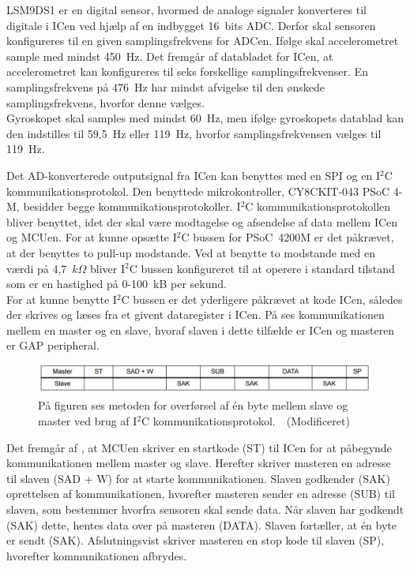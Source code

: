 LSM9DS1 er en digital sensor, hvormed de analoge signaler konverteres til digitale i ICen ved hjælp af en indbygget 16~bits ADC. Derfor skal sensoren konfigureres til en given samplingsfrekvens for ADCen. Ifølge  skal accelerometret sample med mindst 450~Hz. Det fremgår af databladet for ICen, at accelerometret kan konfigureres til seks forskellige samplingsfrekvenser. En samplingsfrekvens på 476~Hz har mindst afvigelse til den ønskede samplingsfrekvens, hvorfor denne vælges. \\
Gyroskopet skal samples med mindst 60~Hz, men ifølge gyroskopets datablad kan den indstilles til 59,5~Hz eller 119~Hz, hvorfor samplingsfrekvensen vælges til 119~Hz.

Det AD-konverterede outputsignal fra ICen kan benyttes med en SPI og en I$^{2}$C kommunikationsprotokol. Den benyttede mikrokontroller, CY8CKIT-043 PSoC 4-M, besidder begge kommunikationsprotokoller. I$^{2}$C kommunikationsprotokollen bliver benyttet, idet der skal være modtagelse og afsendelse af data mellem ICen og MCUen. For at kunne opsætte I$^{2}$C bussen for PSoC~4200M er det påkrævet, at der benyttes to pull-up modstande. Ved at benytte to modstande med en værdi på 4,7~$k\Omega$ bliver I$^{2}$C bussen konfigureret til at operere i standard tilstand som er en hastighed på 0-100~kB per sekund.~\citep{CYPRESS2016} \\
For at kunne benytte I$^{2}$C bussen er det yderligere påkrævet at kode ICen, således der skrives og læses fra et givent dataregister i ICen. På  ses kommunikationen mellem en master og en slave, hvoraf slaven i dette tilfælde er ICen og masteren er GAP peripheral. 
\begin{figure}[H]
	\centering
	\includegraphics[scale=0.75]{figures/cDesign/Sensor_write_read2.png}
	\caption{På figuren ses metoden for overførsel af én byte mellem slave og master ved brug af I$^{2}$C kommunikationsprotokol.~\citep{STMicroelectronics2016}~(Modificeret)}
	\label{Fig:master_slave}
\end{figure}\vspace{-0.25cm}
Det fremgår af , at MCUen skriver en startkode (ST) til ICen for at påbegynde kommunikationen mellem master og slave. Herefter skriver masteren en adresse til slaven (SAD + W) for at starte kommunikationen. Slaven godkender (SAK) oprettelsen af kommunikationen, hvorefter masteren sender en adresse (SUB) til slaven, som bestemmer hvorfra sensoren skal sende data. Når slaven har godkendt (SAK) dette, hentes data over på masteren (DATA). Slaven fortæller, at én byte er sendt (SAK). Afslutningsvist skriver masteren en stop kode til slaven (SP), hvorefter kommunikationen afbrydes.

